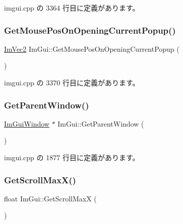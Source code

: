  imgui.\+cpp の 3364 行目に定義があります。

\mbox{\label{namespace_im_gui_ac1ba5d7b76e11d47660b32dc851afd2f}} 
\subsubsection{\texorpdfstring{Get\+Mouse\+Pos\+On\+Opening\+Current\+Popup()}{GetMousePosOnOpeningCurrentPopup()}}
{\footnotesize\ttfamily \mbox{\hyperlink{struct_im_vec2}{Im\+Vec2}} Im\+Gui\+::\+Get\+Mouse\+Pos\+On\+Opening\+Current\+Popup (\begin{DoxyParamCaption}{ }\end{DoxyParamCaption})}



 imgui.\+cpp の 3370 行目に定義があります。

\mbox{\label{namespace_im_gui_afd2f3d9a23ef5cb331d060a0d77e2cde}} 
\subsubsection{\texorpdfstring{Get\+Parent\+Window()}{GetParentWindow()}}
{\footnotesize\ttfamily \mbox{\hyperlink{struct_im_gui_window}{Im\+Gui\+Window}} $\ast$ Im\+Gui\+::\+Get\+Parent\+Window (\begin{DoxyParamCaption}{ }\end{DoxyParamCaption})}



 imgui.\+cpp の 1877 行目に定義があります。

\mbox{\label{namespace_im_gui_af472cb090157c22e65a0aa1662b9f3d0}} 
\subsubsection{\texorpdfstring{Get\+Scroll\+Max\+X()}{GetScrollMaxX()}}
{\footnotesize\ttfamily float Im\+Gui\+::\+Get\+Scroll\+MaxX (\begin{DoxyParamCaption}{ }\end{DoxyParamCaption})}



